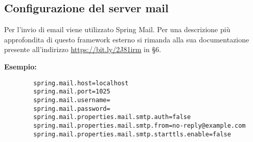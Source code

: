 	\subsection{Configurazione del server mail}

		Per l'invio di email viene utilizzato Spring Mail. Per una descrizione 
		più approfondita di questo framework esterno si rimanda alla sua documentazione
		presente all'indirizzo \url{https://bit.ly/2J81irm} in \S{}6.

		\textbf{Esempio:}
		\begin{lstlisting}
		spring.mail.host=localhost
		spring.mail.port=1025
		spring.mail.username=
		spring.mail.password=
		spring.mail.properties.mail.smtp.auth=false
		spring.mail.properties.mail.smtp.from=no-reply@example.com
		spring.mail.properties.mail.smtp.starttls.enable=false
		\end{lstlisting}
